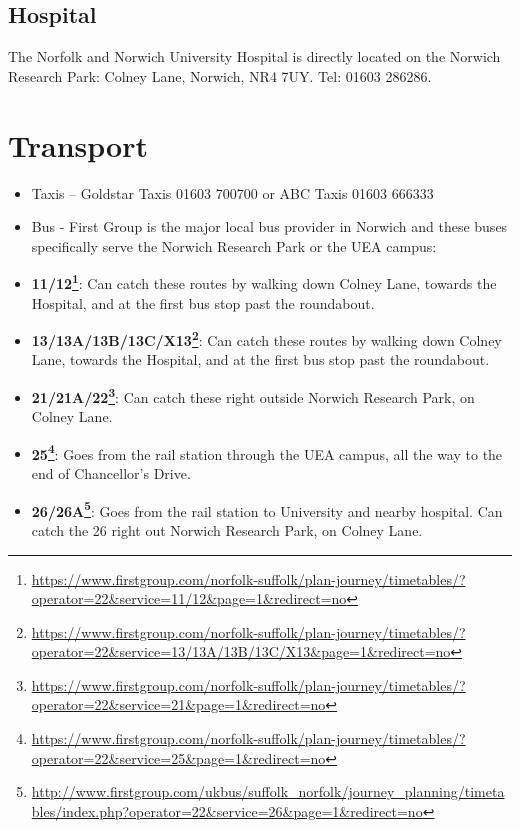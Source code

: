 \documentclass[12pt,]{book}
\providecommand{\tightlist}{%
  \setlength{\itemsep}{0pt}\setlength{\parskip}{0pt}}
\let\rmarkdownfootnote\footnote%
\def\footnote{\protect\rmarkdownfootnote}
\renewcommand{\href}[2]{#2\footnote{\url{#1}}}
\theoremstyle{definition}
\theoremstyle{definition}
\theoremstyle{remark}
\begin{document}
\subsection*{Hospital}\label{hospital}

The Norfolk and Norwich University Hospital is directly located on the
Norwich Research Park: Colney Lane, Norwich, NR4 7UY. Tel: 01603 286286.

\section*{Transport}\label{transport}

\begin{itemize}
\tightlist
\item
  Taxis -- Goldstar Taxis 01603 700700 or ABC Taxis 01603 666333
\item
  Bus - First Group is the major local bus provider in Norwich and these
  buses specifically serve the Norwich Research Park or the UEA campus:
\item
  \textbf{\href{https://www.firstgroup.com/norfolk-suffolk/plan-journey/timetables/?operator=22\&service=11/12\&page=1\&redirect=no}{11/12}}:
  Can catch these routes by walking down Colney Lane, towards the
  Hospital, and at the first bus stop past the roundabout.
\item
  \textbf{\href{https://www.firstgroup.com/norfolk-suffolk/plan-journey/timetables/?operator=22\&service=13/13A/13B/13C/X13\&page=1\&redirect=no}{13/13A/13B/13C/X13}}:
  Can catch these routes by walking down Colney Lane, towards the
  Hospital, and at the first bus stop past the roundabout.
\item
  \textbf{\href{https://www.firstgroup.com/norfolk-suffolk/plan-journey/timetables/?operator=22\&service=21\&page=1\&redirect=no}{21/21A/22}}:
  Can catch these right outside Norwich Research Park, on Colney Lane.
\item
  \textbf{\href{https://www.firstgroup.com/norfolk-suffolk/plan-journey/timetables/?operator=22\&service=25\&page=1\&redirect=no}{25}}:
  Goes from the rail station through the UEA campus, all the way to the
  end of Chancellor's Drive.
\item
  \textbf{\href{http://www.firstgroup.com/ukbus/suffolk_norfolk/journey_planning/timetables/index.php?operator=22\&service=26\&page=1\&redirect=no}{26/26A}}:
  Goes from the rail station to University and nearby hospital. Can
  catch the 26 right out Norwich Research Park, on Colney Lane.
\end{itemize}
\end{document}
